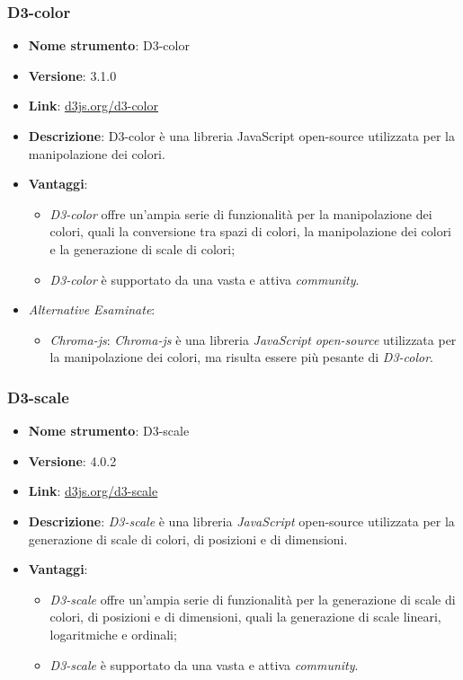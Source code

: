 \subsubsection{D3-color}
\begin{itemize}
      \item \textbf{Nome strumento}: D3-color
      \item \textbf{Versione}: 3.1.0
      \item \textbf{Link}: \href{https://d3js.org/d3-color}{d3js.org/d3-color}
      \item \textbf{Descrizione}: D3-color è una libreria JavaScript open-source utilizzata per la manipolazione dei colori.
      \item \textbf{Vantaggi}:
            \begin{itemize}
                  \item \textit{D3-color} offre un'ampia serie di funzionalità per la manipolazione dei colori, quali la conversione tra spazi di colori, la manipolazione dei colori
                        e la generazione di scale di colori;
                  \item \textit{D3-color} è supportato da una vasta e attiva \textit{community}.
            \end{itemize}
      \item \textit{Alternative Esaminate}:
            \begin{itemize}
                  \item \textit{Chroma-js}: \textit{Chroma-js} è una libreria \textit{JavaScript} \textit{open-source} utilizzata per la manipolazione dei colori, ma risulta essere più pesante di \textit{D3-color}.
            \end{itemize}
\end{itemize}

\subsubsection{D3-scale}
\begin{itemize}
      \item \textbf{Nome strumento}: D3-scale
      \item \textbf{Versione}: 4.0.2
      \item \textbf{Link}: \href{https://d3js.org/d3-scale}{d3js.org/d3-scale}
      \item \textbf{Descrizione}: \textit{D3-scale} è una libreria \textit{JavaScript} open-source utilizzata per la generazione di scale di colori, di posizioni e di dimensioni.
      \item \textbf{Vantaggi}:
            \begin{itemize}
                  \item \textit{D3-scale} offre un'ampia serie di funzionalità per la generazione di scale di colori, di posizioni e di dimensioni, quali la generazione di scale lineari,
                        logaritmiche e ordinali;
                  \item \textit{D3-scale} è supportato da una vasta e attiva \textit{community}.
            \end{itemize}
\end{itemize}

